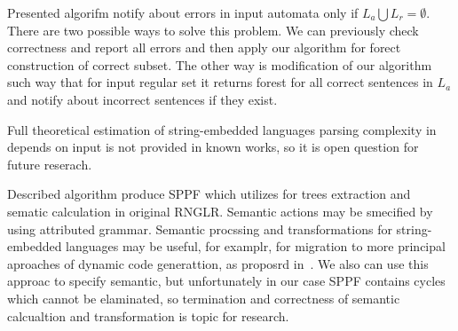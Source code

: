 \documentclass{llncs}
\begin{document}
Presented algorifm notify about errors in input automata only if $L_a \bigcup L_r = \emptyset$. There are two possible ways to solve this problem.
We can previously check correctness and report all errors and then apply our algorithm for forect construction of correct subset.
The other way is modification of our algorithm such way that for input regular set it returns forest for all correct sentences in $L_a$ 
and notify about incorrect sentences if they exist.

Full theoretical estimation of string-embedded languages parsing complexity in depends on input is not provided 
in known works, so it is open question for future reserach.

Described algorithm produce SPPF which utilizes for trees extraction and sematic calculation in original RNGLR. Semantic actions may be smecified by using attributed grammar.
Semantic procssing and transformations for string-embedded languages may be useful, for examplr, for migration to more principal aproaches of dynamic code generattion, as proposrd in~\cite{EvalToStaged}.
We also can use this approac to specify semantic, but unfortunately in our case SPPF contains cycles which cannot be elaminated, so termination 
and correctness of semantic calcualtion and transformation is topic for research. 

\end{document}
